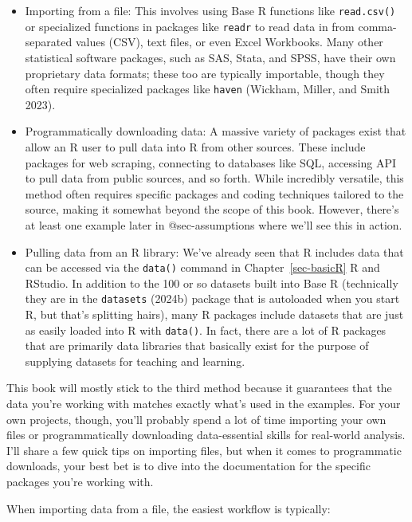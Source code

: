 \documentclass[
  letterpaper,
]{book}
\begin{document}
\begin{itemize}
\item
  Importing from a file: This involves using Base R functions like
  \texttt{read.csv()} or specialized functions in packages like
  \texttt{readr} to read data in from comma-separated values (CSV), text
  files, or even Excel Workbooks. Many other statistical software
  packages, such as SAS, Stata, and SPSS, have their own proprietary
  data formats; these too are typically importable, though they often
  require specialized packages like \texttt{haven} (Wickham, Miller, and
  Smith 2023).
\item
  Programmatically downloading data: A massive variety of packages exist
  that allow an R user to pull data into R from other sources. These
  include packages for web scraping, connecting to databases like SQL,
  accessing API to pull data from public sources, and so forth. While
  incredibly versatile, this method often requires specific packages and
  coding techniques tailored to the source, making it somewhat beyond
  the scope of this book. However, there's at least one example later in
  @sec-assumptions where we'll see this in action.
\item
  Pulling data from an R library: We've already seen that R includes
  data that can be accessed via the \texttt{data()} command in
  Chapter~\ref{sec-basicR} R and RStudio. In addition to the 100 or so
  datasets built into Base R (technically they are in the
  \texttt{datasets} (2024b) package that is autoloaded when you start R,
  but that's splitting hairs), many R packages include datasets that are
  just as easily loaded into R with \texttt{data()}. In fact, there are
  a lot of R packages that are primarily data libraries that basically
  exist for the purpose of supplying datasets for teaching and learning.
\end{itemize}

This book will mostly stick to the third method because it guarantees
that the data you're working with matches exactly what's used in the
examples. For your own projects, though, you'll probably spend a lot of
time importing your own files or programmatically downloading
data-essential skills for real-world analysis. I'll share a few quick
tips on importing files, but when it comes to programmatic downloads,
your best bet is to dive into the documentation for the specific
packages you're working with.

When importing data from a file, the easiest workflow is typically:
\end{document}
